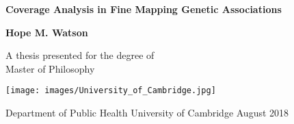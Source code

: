 \begin{titlepage}
    \begin{center}
        \vspace*{1cm}
        
        \Huge
        \textbf{Coverage Analysis in Fine Mapping Genetic Associations}
        
        \vspace{2.0cm}
        
        \LARGE
        \textbf{Hope M. Watson}
        
        \vfill
        
        A thesis presented for the degree of\\
        Master of Philosophy 
        
        \vspace{0.8cm}
        
        \texttt{[image: images/University\_of\_Cambridge.jpg]}
        
        \Large
        Department of Public Health 
        University of Cambridge
        August 2018
        
        
    \end{center}







\end{titlepage} 